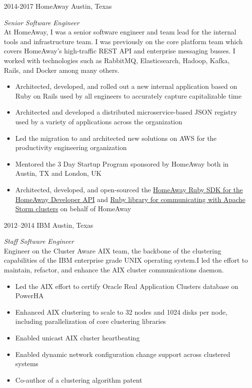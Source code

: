 \documentclass{friggeri-cv} %
\begin{document}
\begin{entrylist}
\entry
{2014-2017}
{HomeAway}
{Austin, Texas}
{\emph{Senior Software Engineer} \\
At HomeAway, I was a senior software engineer and team lead for the internal tools and infrastructure team. I was previously on the core platform team which covers HomeAway's high-traffic REST API and enterprise messaging busses. I worked with technologies such as RabbitMQ, Elasticsearch, Hadoop, Kafka, Rails, and Docker among many others. \\
\begin{itemize}
\item Architected, developed, and rolled out a new internal application based on Ruby on Rails used by all engineers to accurately capture capitalizable time
\item Architected and developed a distributed microservice-based JSON registry used by a variety of applications across the organization
\item Led the migration to and architected new solutions on AWS for the productivity engineering organization
\item Mentored the 3 Day Startup Program sponsored by HomeAway both in Austin, TX and London, UK
\item Architected, developed, and open-sourced the \href{https://github.com/homeaway/homeaway_api_ruby}{HomeAway Ruby SDK for the HomeAway Developer API} and \href{https://github.com/homeaway/homeaway-storm}{Ruby library for communicating with Apache Storm clusters} on behalf of HomeAway
\end{itemize}}
\end{entrylist}
\begin{entrylist}
\entry
{2012--2014}
{IBM}
{Austin, Texas}
{\emph{Staff Software Engineer} \\
Engineer on the Cluster Aware AIX team, the backbone of the clustering capabilities of the IBM enterprise grade UNIX operating system.I led the effort to maintain, refactor, and enhance the AIX cluster communications daemon. \\
\begin{itemize}
\item Led the AIX effort to certify Oracle Real Application Clusters database on PowerHA
\item Enhanced AIX clustering to scale to 32 nodes and 1024 disks per node, including parallelization of core clustering libraries
\item Enabled unicast AIX cluster heartbeating
\item Enabled dynamic network configuration change support across clustered systems
\item Co-author of a clustering algorithm patent 
\end{itemize}}
\end{entrylist}
\end{document}
